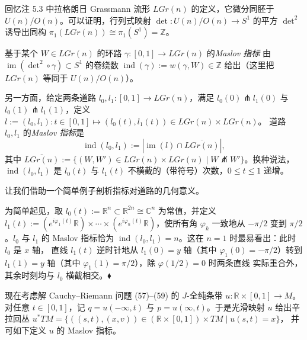 回忆注 5.3 中拉格朗日 Grassmann 流形 $LGr(n)$ 的定义，它微分同胚于
$U(n)/O(n)$。可以证明，行列式映射 $\det:U(n)/O(n)\to S^1$ 的平方
$\det^2$ 诱导出同构 $\pi_1(LGr(n))\cong\pi_1(S^1)=\mathbb Z$。

\begin{Def}\label{def:5.15}
基于某个 $W\in LGr(n)$ 的环路 $\gamma:[0,1]\to LGr(n)$ 的\emph{Maslov 指标}
由 $\operatorname{im}(\det^2\circ\gamma)\subset S^1$ 的卷绕数
$\operatorname{ind}(\gamma):=w(\gamma,W)\in\mathbb Z$ 给出（这里把
$LGr(n)$ 等同于 $U(n)/O(n)$）。

另一方面，给定两条道路 $l_0,l_1:[0,1]\to LGr(n)$，满足
$l_0(0)\pitchfork l_1(0)$ 与 $l_0(1)\pitchfork l_1(1)$，定义
$l:=(l_0,l_1):t\in[0,1]\mapsto(l_0(t),l_1(t))\in LGr(n)\times LGr(n)$。
道路 $l_0,l_1$ 的\emph{Maslov 指标}是
\begin{equation}
\operatorname{ind}(l_0,l_1):=\left|\operatorname{im}(l)\cap
\overline{LGr(n)}\right|,
\label{eq:5.60}
\end{equation}
其中 $\overline{LGr(n)}:=\{(W,W')\in LGr(n)\times LGr(n)\mid
W\not\pitchfork W'\}$。换种说法，$\operatorname{ind}(l_0,l_1)$ 是
$l_0(t)$ 与 $l_1(t)$ 不横截的（带符号）次数，$0\le t\le1$ 递增。
\end{Def}


让我们借助一个简单例子剖析指标对道路的几何意义。

\begin{Ex}\label{ex:5.16}
为简单起见，取 $l_0(t):=\mathbb R^n\subset\mathbb R^{2n}\cong\mathbb C^n$
为常值，并定义
$l_1(t):=(e^{i\varphi_1(t)}\mathbb R)\times\cdots\times
(e^{i\varphi_n(t)}\mathbb R)$，使所有角 $\varphi_k$ 一致地从 $-\pi/2$ 变到
$\pi/2$。$l_0$ 与 $l_1$ 的 Maslov 指标恰为
$\operatorname{ind}(l_0,l_1)=n$。这在 $n=1$ 时最易看出：此时 $l_0$ 是 $x$ 轴，
直线 $l_1(t)$ 逆时针地从 $l_1(0)=y$ 轴（其中 $\varphi_1(0)=-\pi/2$）转到
$l_1(1)=y$ 轴（其中 $\varphi_1(1)=\pi/2$），除 $\varphi(1/2)=0$ 时两条直线
实际重合外，其余时刻均与 $l_0$ 横截相交。\hfill$\blacklozenge$
\end{Ex}

现在考虑解 Cauchy--Riemann 问题 (57)--(59) 的 $J$-全纯条带
$u:\mathbb R\times[0,1]\to M$。对任意 $t\in[0,1]$，记
$q=u(-\infty,t)$ 与 $p=u(\infty,t)$。于是光滑映射 $u$ 给出辛拉回丛
$u^*TM=\{((s,t),(x,v))\in(\mathbb R\times[0,1])\times TM\mid u(s,t)=x\}$，
并可如下定义 $u$ 的 Maslov 指标。

